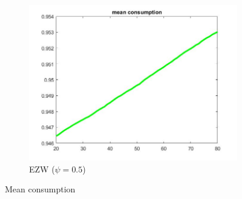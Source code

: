 \documentclass[12pt,a4paper]{article}
\begin{document}
\begin{figure}[h!]
\begin{subfigure}[b]{0.32\linewidth}
    \includegraphics[width=\linewidth]{graphs/Q4/mean_cons_ezw.jpg}
      \caption{EZW ($\psi = 0.5$)}
  \end{subfigure}
  \caption{Mean consumption}
    \label{fig:7}
\end{figure}
\end{document}
